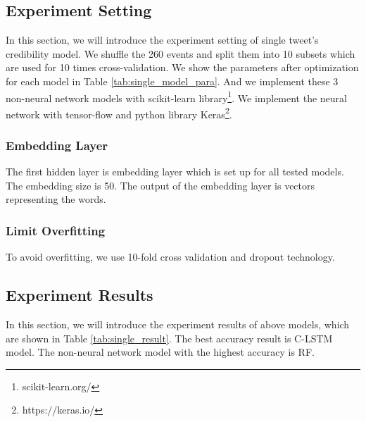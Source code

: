 \subsection{Experiment Setting}
In this section, we will introduce the experiment setting of single tweet's credibility model. We shuffle the 260 events and split them into 10 subsets which are used for 10 times cross-validation. We show the parameters after optimization for each model in Table \ref{tab:single_model_para}. And we implement these 3 non-neural network models with scikit-learn library\footnote{scikit-learn.org/}. We implement the neural network with tensor-flow and python library Keras\footnote{https://keras.io/}.


\begin{table}[!h]
 \centering
{}
 \caption{Parameters of Classification Models}
 \label{tab:single_model_para}
\end{table}
 \subsubsection{Embedding Layer}  
  The first hidden layer is embedding layer which is set up for all tested models. The embedding size is 50. The output of the embedding layer is vectors representing the words. 
 \subsubsection{Limit Overfitting}  
 To avoid overfitting, we use 10-fold cross validation and dropout technology.
 
  \subsection{Experiment Results}  
In this section, we will introduce the experiment results of above models, which are shown in Table \ref{tab:single_result}. The best accuracy result is C-LSTM model. The non-neural network model with the highest accuracy is RF.

